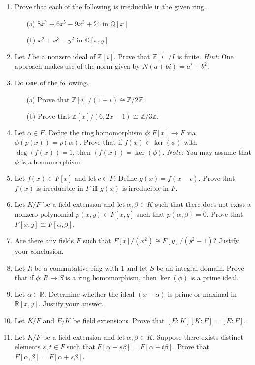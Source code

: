 \documentclass[11pt]{scrartcl}
\theoremstyle{definition}
\begin{document}
\begin{enumerate}

\item Prove that each of the following is irreducible in the given ring.
\begin{enumerate}
\item[(a)] $8x^7+6x^5-9x^3+24$ in $\mathbb{Q}[x]$
\item[(b)] $x^2+x^3-y^2$ in $\mathbb{C}[x,y]$
\end{enumerate}

\item Let $I$ be a nonzero ideal of $\mathbb{Z}[i]$.  Prove that $\mathbb{Z}[i]/I$ is finite. \emph{Hint:} One approach makes use of the norm given by $N(a+bi)=a^2+b^2$. 

\item Do \textbf{one} of the following.
\begin{enumerate}
\item[(a)] Prove that $\mathbb{Z}[i]/(1+i)\cong \mathbb{Z}/2\mathbb{Z}$.
\item[(b)] Prove that $\mathbb{Z}[x]/(6,2x-1)\cong \mathbb{Z}/3\mathbb{Z}$.
\end{enumerate}

\item Let $\alpha\in F$.  Define the ring homomorphism $\phi:F[x]\to F$ via $\phi(p(x))=p(\alpha)$.  Prove that if $f(x)\in\ker(\phi)$ with $\deg(f(x))=1$, then $(f(x))=\ker(\phi)$. \emph{Note:} You may assume that $\phi$ is a homomorphism.

\item Let $f(x)\in F[x]$ and let $c\in F$. Define $g(x)=f(x-c)$. Prove that $f(x)$ is irreducible in $F$ iff $g(x)$ is irreducible in $F$.

\item Let $K/F$ be a field extension and let $\alpha,\beta\in K$ such that there does not exist a nonzero polynomial $p(x,y)\in F[x,y]$ such that $p(\alpha,\beta)=0$.  Prove that $F[x,y]\cong F[\alpha,\beta]$.

\item Are there any fields $F$ such that $F[x]/(x^2)\cong F[y]/(y^2-1)$?  Justify your conclusion.

\item Let $R$ be a commutative ring with 1 and let $S$ be an integral domain.  Prove that if $\phi:R\to S$ is a ring homomorphism, then $\ker(\phi)$ is a prime ideal.

\item Let $\alpha\in \mathbb{R}$. Determine whether the ideal $(x-\alpha)$ is prime or maximal in $\mathbb{R}[x,y]$.  Justify your answer.

\item Let $K/F$ and $E/K$ be field extensions. Prove that $[E:K][K:F]=[E:F]$.

\item Let $K/F$ be a field extension and let $\alpha,\beta\in K$.  Suppose there exists distinct elements $s,t\in F$ such that $F[\alpha+s\beta]=F[\alpha+t\beta]$. Prove that $F[\alpha,\beta]=F[\alpha+s\beta]$.

\end{enumerate}
\end{document}
